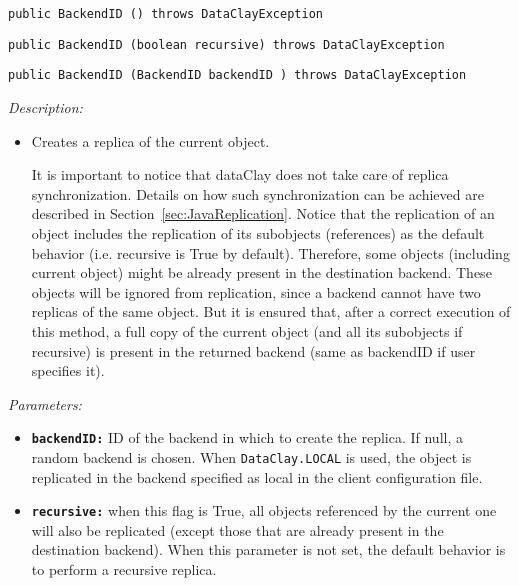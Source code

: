 \begin{dBox}

\texttt{public BackendID () throws DataClayException}

\texttt{public BackendID (boolean recursive) throws DataClayException}

\texttt{public BackendID (BackendID backendID ) throws DataClayException}
\LINE

{\it Description:}

\begin{itemize}
    \item Creates a replica of the current object.
    
    It is important to notice that dataClay does not take care of replica synchronization. Details on how such synchronization can be achieved are described in Section~\ref{sec:JavaReplication}.
    \newline
    \newline
    Notice that the replication of an object includes the replication of its subobjects (references) as the default behavior (i.e. recursive is True by default). Therefore, some objects (including current object) might be already present in the destination backend. These objects will be ignored from replication, since a backend cannot have two replicas of the same object. But it is ensured that, after a correct execution of this method, a full copy of the current object (and all its subobjects if recursive) is present in the returned backend (same as backendID if user specifies it).

\end{itemize}

{\it Parameters:}

\begin{itemize}
    \item \texttt{\bfseries backendID:} ID of the backend in which to create the replica. If null, a random backend is chosen. When \texttt{DataClay.LOCAL} is used, the object is replicated in the backend specified as local in the client configuration file.
    \item \texttt{\bfseries recursive:} when this flag is True, all objects referenced by the current one will also be replicated (except those that are already present in the destination backend). When this parameter is not set, the default behavior is to perform a recursive replica.
\end{itemize}


\end{dBox}
